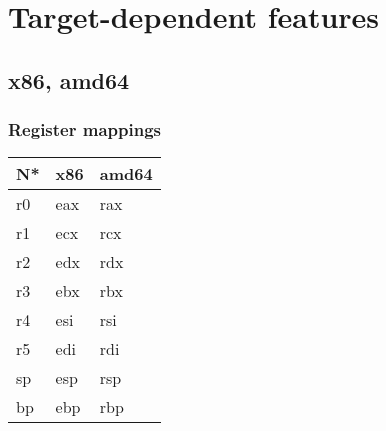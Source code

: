\chapter{Target-dependent features}\label{chap:nstar-specific}

\section{x86, amd64}\label{sec:nstar-specific-x86amd64}

\subsection{Register mappings}\label{subsec:nstar-specific-x86amd64-registers}

\begin{tabularx}{\textwidth}{Y Y Y}
  \toprule
  N* & x86 & amd64 \\
  \midrule
  r0 & eax & rax \\
  r1 & ecx & rcx \\
  r2 & edx & rdx \\
  r3 & ebx & rbx \\
  r4 & esi & rsi \\
  r5 & edi & rdi \\
  \cmidrule(lr){1-3}
  sp & esp & rsp \\
  bp & ebp & rbp \\
  \bottomrule
\end{tabularx}
